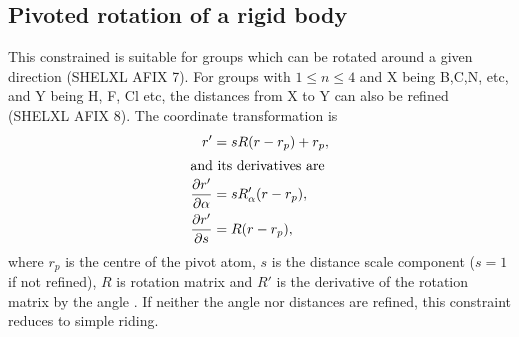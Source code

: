 \documentclass[pdf]{iucr}
\begin{document}
\subsection{Pivoted rotation of a rigid body}
\label{sec:pivoted:rotated:group}
This constrained is suitable for groups which can be rotated around a given direction (SHELXL AFIX 7). For groups  with $1\leq n \leq 4$ and X being B,C,N, etc, and Y being H, F, Cl etc, the distances from X to Y can also be refined (SHELXL AFIX 8). The coordinate transformation is
\begin{align}
r' &= sR(r-r_p) + r_{p},\\
\intertext{and its derivatives are}
\frac{\partial r'}{\partial \alpha} &= sR'_\alpha(r - r_p),\\ 
\frac{\partial r'}{\partial s} &= R(r-r_p),
\end{align}
where $r_p$ is the centre of the pivot atom, $s$ is the distance scale component ($s=1$ if not refined), $R$ is rotation matrix  and $R'$ is the derivative of the rotation matrix by the angle . If neither the angle nor distances are refined, this constraint reduces to simple riding.
\end{document}
